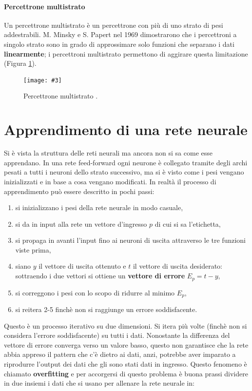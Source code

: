 \documentclass[12pt, twoside, letterpaper]{report}
\newcommand{\img}[4] {
	\begin{figure}
		\centering
		\texttt{[image: \#3]}\\
		\caption{#1}
		\label{fig:#4}
	\end{figure}
}
\begin{document}
			\paragraph{Percettrone multistrato} Un percettrone multistrato è un percettrone con più di uno strato di pesi addestrabili. M. Minsky e S. Papert nel 1969 \cite{minsky_papert} dimostrarono che i percettroni a singolo strato sono in grado di approssimare solo funzioni che separano i dati \textbf{linearmente}; i percettroni multistrato permettono di aggirare questa limitazione (Figura \ref{fig:feedforward}). 
				\img{Percettrone multistrato \cite{kriesel}.}{0.5}{nn-feed-forward.png}{feedforward}
		
		\section{Apprendimento di una rete neurale}
			Si è vista la struttura delle reti neurali ma ancora non si sa come esse apprendano. In una rete feed-forward ogni neurone è collegato tramite degli archi pesati a tutti i neuroni dello strato successivo, ma si è visto come i pesi vengano inizializzati e in base a cosa vengano modificati. In realtà il processo di apprendimento può essere descritto in pochi passi: 
			\begin{enumerate}
				\item si inizializzano i pesi della rete neurale in modo casuale,
				\item si da in input alla rete un vettore d'ingresso $p$ di cui si sa l'etichetta,
				\item si propaga in avanti l'input fino ai neuroni di uscita attraverso le tre funzioni viste prima, 
				\item siano $y$ il vettore di uscita ottenuto e $t$ il vettore di uscita desiderato: sottraendo i due vettori si ottiene un \textbf{vettore di errore} $E_p = t - y$,
				\item si correggono i pesi con lo scopo di ridurre al minimo $E_p$,
				\item si reitera 2-5 finchè non si raggiunge un errore soddisfacente.
			\end{enumerate}
			Questo è un processo iterativo su due dimensioni. Si itera più volte (finchè non si considera l'errore soddisfacente) su tutti i dati. Nonostante la differenza del vettore di errore converga verso un valore basso, questo non garantisce che la rete abbia appreso il pattern che c'è dietro ai dati, anzi, potrebbe aver imparato a riprodurre l'output dei dati che gli sono stati dati in ingresso. Questo fenomeno è chiamato \textbf{overfitting} e per accorgersi di questo problema è buona prassi dividere in due insiemi i dati che si usano per allenare la rete neurale in: 
\end{document}
